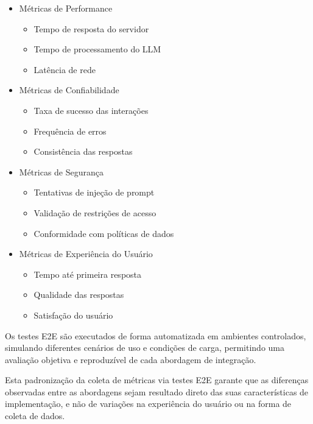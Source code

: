 \documentclass[
]{article}
\providecommand{\tightlist}{%
  \setlength{\itemsep}{0pt}\setlength{\parskip}{0pt}}
\begin{document}
\begin{itemize}
\tightlist
\item
  Métricas de Performance

  \begin{itemize}
  \tightlist
  \item
    Tempo de resposta do servidor
  \item
    Tempo de processamento do LLM
  \item
    Latência de rede
  \end{itemize}
\item
  Métricas de Confiabilidade

  \begin{itemize}
  \tightlist
  \item
    Taxa de sucesso das interações
  \item
    Frequência de erros
  \item
    Consistência das respostas
  \end{itemize}
\item
  Métricas de Segurança

  \begin{itemize}
  \tightlist
  \item
    Tentativas de injeção de prompt
  \item
    Validação de restrições de acesso
  \item
    Conformidade com políticas de dados
  \end{itemize}
\item
  Métricas de Experiência do Usuário

  \begin{itemize}
  \tightlist
  \item
    Tempo até primeira resposta
  \item
    Qualidade das respostas
  \item
    Satisfação do usuário
  \end{itemize}
\end{itemize}

Os testes E2E são executados de forma automatizada em ambientes
controlados, simulando diferentes cenários de uso e condições de carga,
permitindo uma avaliação objetiva e reproduzível de cada abordagem de
integração.

Esta padronização da coleta de métricas via testes E2E garante que as
diferenças observadas entre as abordagens sejam resultado direto das
suas características de implementação, e não de variações na experiência
do usuário ou na forma de coleta de dados.
\end{document}
